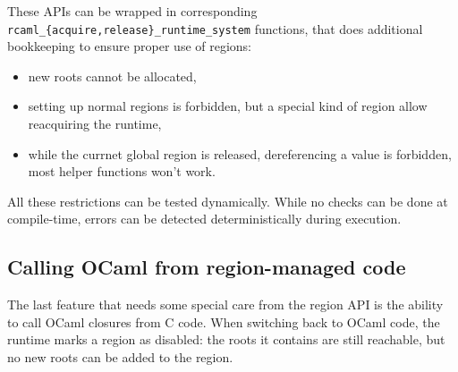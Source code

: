 \documentclass[a4paper]{easychair}
\begin{document}
These APIs can be wrapped in corresponding
\texttt{rcaml\_\{acquire,release\}\_runtime\_system} functions, that
does additional bookkeeping to ensure proper use of regions:

\begin{itemize}
\tightlist
\item
  new roots cannot be allocated,
\item
  setting up normal regions is forbidden, but a special kind of region
  allow reacquiring the runtime,
\item
  while the currnet global region is released, dereferencing a value is
  forbidden, most helper functions won't work.
\end{itemize}

\begin{Shaded}
\begin{Highlighting}[]
\NormalTok{);}
\NormalTok{);}

\NormalTok{);}
\NormalTok{);}

\CommentTok{// \{}
\CommentTok{//   \{}
\CommentTok{//   \}}
\CommentTok{// \}}
\end{Highlighting}
\end{Shaded}

All these restrictions can be tested dynamically. While no checks can be
done at compile-time, errors can be detected deterministically during
execution.

\hypertarget{calling-ocaml-from-region-managed-code}{%
\subsection{Calling OCaml from region-managed
code}\label{calling-ocaml-from-region-managed-code}}

The last feature that needs some special care from the region API is the
ability to call OCaml closures from C code. When switching back to OCaml
code, the runtime marks a region as disabled: the roots it contains are
still reachable, but no new roots can be added to the region.
\end{document}
